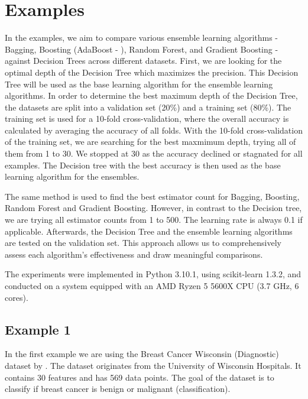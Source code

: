 \section{Examples}
In the examples, we aim to compare various ensemble learning algorithms - Bagging, 
Boosting (AdaBoost - \citet{freund1996experiments}), Random Forest, and Gradient 
Boosting - against Decision Trees across different datasets.
First, we are looking for the optimal depth of the Decision Tree which maximizes the 
precision. This Decision Tree will be used as the base learning algorithm for 
the ensemble learning algorithms.
In order to determine the best maximum depth of the Decision Tree, the datasets are 
split into a validation set (20\%) and a training set (80\%). The training set is used
for a 10-fold cross-validation, where the overall accuracy is calculated by averaging the 
accuracy of all folds. With the 10-fold cross-validation of the training set, we are
searching for the best maxmimum depth, trying all of them from 1 to 30. We stopped at
30 as the accuracy declined or stagnated for all examples. The Decision tree with the
best accuracy is then used as the base learning algorithm for the ensembles.


The same method is used to find the best estimator count for Bagging, Boosting, 
Random Forest and Gradient Boosting. However, in contrast to the Decision tree,
we are trying all estimator counts from 1 to 500.
The learning rate is always 0.1 if applicable. Afterwards, the Decision Tree and
the ensemble learning algorithms are tested on the validation set.
This approach allows us to comprehensively assess each algorithm's effectiveness
and draw meaningful comparisons.


The experiments were implemented in Python 3.10.1, using scikit-learn 1.3.2, and
conducted on a system equipped with an AMD Ryzen 5 5600X CPU (3.7 GHz, 6 cores).

\newpage %
\subsection{Example 1}
In the first example we are using the Breast Cancer Wisconsin (Diagnostic)
dataset by \citet*{breast_cancer_wisconsin}. The dataset originates from
the University of Wisconsin Hospitals. It contains 30 features and has 569
data points. The goal of the dataset is to classify if breast cancer
is benign or malignant (classification).



